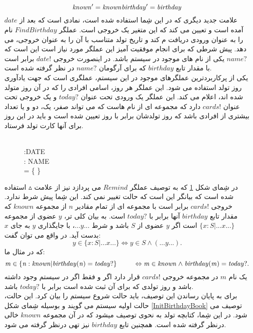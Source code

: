  \[
 \mathit{known'} = \mathit{known}\\
 \mathit{birthday'}= \mathit{birthday}
 \]
 علامت جدید دیگری که در این شِما استفاده شده است، نمادی است که بعد از $\mathit{date}$ آمده است و تعیین می کند که این متغیر یک خروجی است. عملگر 
 $\mathit{FindBirthday}$
  نام را به عنوان ورودی دریافت م کند و تاریخ تولد متناسب با آن را به عنوان خروجی، می دهد. پیش شرطی که برای انجام موفقیت آمیز این عملگر مورد نیاز است این است که 
  $\mathit{name?}$
   یکی از نام های موجود در سیستم باشد. در اینصورت خروجی 
   $\mathit{date!}$
    برابر است با مقدار تابع $\mathit{birthday}$ که برای آرگومان 
    $\mathit{name?}$
    در نظر گرفته شده است.
    \\
    یکی از پرکاربردترین عملگرهای موجود در این سیستم، عملگری است که جهت یادآوری روز تولد استفاده می شود. این عملگر هر روز، اسامی افرادی را که در آن روز متولد شده اند، اعلام می کند. این عملگر یک ورودی تحت عنوان 
    $\mathit{today?}$
     و یک خروجی تحت عنوان 
     $\mathit{cards!}$
     دارد که مجموعه ای از نام هاست که می تواند صفر، یک، دو و یا تعداد بیشتری از افرادی باشد که روز تولدشان برابر با روز تعیین شده است و باید در این روز برای آنها کارت تولد فرستاد.
\begin{figure}
\centering
\begin{schema}{}
\vartriangle {}\\
:DATE \\
: \enspace NAME \\
\ST
{}= \{ \}
\end{schema}
\caption{}
\label{Remind}
\end{figure}      
 در شِمای شکل \ref{Remind} که به توصیف عملگر 
 $\mathit{Remind}$
  می پردازد نیز از علامت $\vartriangle$ استفاده شده است که بیانگر این است که حالت تغییر نمی کند. این شِما پیش شرط ندارد. خروجی 
  $\mathit{cards!}$
  برابر است با مجموعه ای از تمام مقادیر $n$ از مجموعه $\mathit{known}$ که مقدار تابع $\mathit{birthday}$ آنها برابر با $\mathit{today?}$ است. به بیان کلی تر، $y$ عضوی از مجموعه 
  $\{x:S|...x...\}$
   است اگر $y$ عضوی از $S$ باشد و شرط
   $...y...$،
   با جایگذاری $y$ به جای $x$ بدست آید. در واقع می توان گفت:
   \[
   y \in \{x:S|...x...\}\Leftrightarrow y \in S \land (...y...).
   \]
که در مثال ما:
\[
\mathit{m \in \{n: known | birthday(n)=today?}\}\\
\hspace{25pt}  \Leftrightarrow \mathit{m \in known \land birthday(m)=today?}.
\]
یک نام $m$ در مجموعه خروجی $\mathit{cards!}$ قرار دارد اگر و فقط اگر در سیستم وجود داشته باشد و روز تولدی که برای آن ثبت شده است برابر با $\mathit{today?}$ باشد.
\\
برای به پایان رساندن این توصیف، باید حالت شروع سیستم را بیان کرد. این حالت، حالت اولیه 
سیستم می گویند و بوسیله شِمای شکل
\ref{InitBirthdayBook}
 توصیف می شود. در این شِما، کتابچه تولد به نحوی توصیف میشود که در آن مجموعه 
 $\mathit{known}$
 خالی درنظر گرفته شده است. همچنین تابع $\mathit{birthday}$ نیز تهی درنظر گرفته می شود.
 
